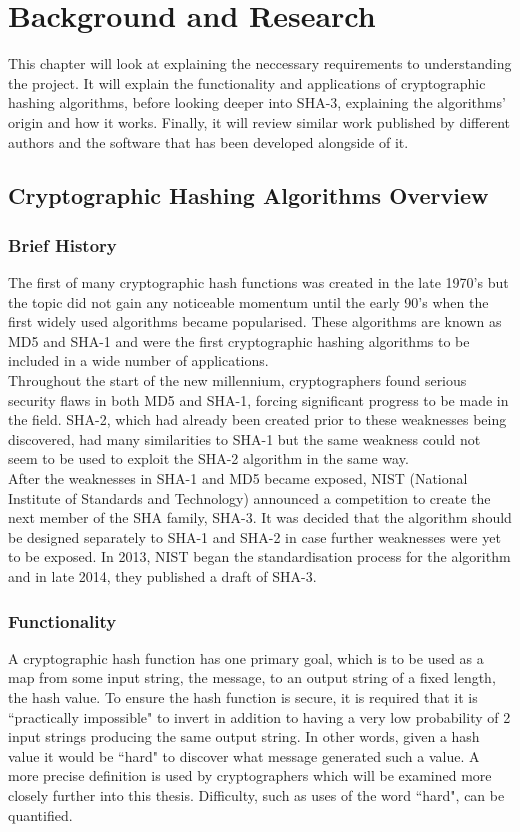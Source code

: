 \chapter{Background and Research}
This chapter will look at explaining the neccessary requirements to understanding the project. It will explain the functionality and applications of cryptographic hashing algorithms, before looking deeper into SHA-3, explaining the algorithms' origin and how it works. Finally, it will review similar work published by different authors and the software that has been developed alongside of it.
\section{Cryptographic Hashing Algorithms Overview}
\subsection{Brief History}
The first of many cryptographic hash functions was created in the late 1970's but the topic did not gain any noticeable momentum until the early 90's when the first widely used algorithms became popularised. These algorithms are known as MD5 and SHA-1 and were the first cryptographic hashing algorithms to be included in a wide number of applications.
\vspace{5 mm}\\
Throughout the start of the new millennium, cryptographers found serious security flaws in both MD5 and SHA-1, forcing significant progress to be made in the field. SHA-2, which had already been created prior to these weaknesses being discovered, had many similarities to SHA-1 but the same weakness could not seem to be used to exploit the SHA-2 algorithm in the same way. \vspace{5 mm}\\
After the weaknesses in SHA-1 and MD5 became exposed, NIST (National Institute of Standards and Technology) announced a competition to create the next member of the SHA family, SHA-3. It was decided that the algorithm should be designed separately to SHA-1 and SHA-2 in case further weaknesses were yet to be exposed. In 2013, NIST began the standardisation process for the algorithm and in late 2014, they published a draft of SHA-3.\cite{SHA3comp}
\subsection{Functionality}
A cryptographic hash function has one primary goal, which is to be used as a map from some input string, the message, to an output string of a fixed length, the hash value. To ensure the hash function is secure, it is required that it is ``practically impossible" to invert in addition to having a very low probability of 2 input strings producing the same output string. In other words, given a hash value it would be ``hard" to discover what message generated such a value.  A more precise definition is used by cryptographers which will be examined more closely further into this thesis. Difficulty, such as uses of the word ``hard", can be quantified.
